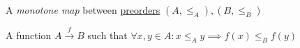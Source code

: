 
A \emph{monotone map} between \href{doc/1 math/Seven Sketches in Compositionality/1 Generative Effects/Preorders/Preorder}{preorders} $(A, \leq_A), (B, \leq_B)$

A function $A \xrightarrow{f} B$ such that $\forall x,y \in A: x \leq_A y \implies f(x) \leq_B f(y)$